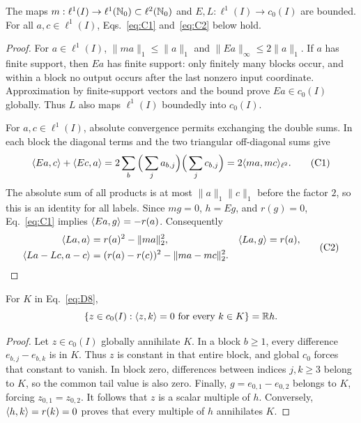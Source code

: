 \begin{lemma}
\label{lem:coordinate-pairing}
The maps $m:\ell^1(I)\to\ell^1(\mathbb N_0)\subset\ell^2(\mathbb N_0)$ and
$E,L:\ell^1(I)\to c_0(I)$ are bounded. For all $a,c\in\ell^1(I)$,
Eqs.~\eqref{eq:C1} and~\eqref{eq:C2} below hold.
\end{lemma}
\begin{proof}
\label{sec:C1}
For $a\in\ell^1(I)$, $\|ma\|_1\le\|a\|_1$ and
$\|Ea\|_\infty\le2\|a\|_1$. If $a$ has finite support, then $Ea$ has
finite support: only finitely many blocks occur, and within a block no
output occurs after the last nonzero input coordinate. Approximation by
finite-support vectors and the bound prove $Ea\in c_0(I)$ globally.
Thus $L$ also maps $\ell^1(I)$ boundedly into $c_0(I)$.

For $a,c\in\ell^1(I)$, absolute convergence permits exchanging the double
sums. In each block the diagonal terms and the two triangular
off-diagonal sums give
\begin{equation}
\langle Ea,c\rangle+\langle Ec,a\rangle
 =2\sum_b\Big(\sum_j a_{b,j}\Big)\Big(\sum_j c_{b,j}\Big)
 =2\langle ma,mc\rangle_{\ell^2}.
\tag{C1}\label{eq:C1}
\end{equation}
The absolute sum of all products is at most $\|a\|_1\|c\|_1$ before the
factor $2$, so this is an identity for all labels. Since $mg=0$, $h=Eg$,
and $r(g)=0$, Eq.~\eqref{eq:C1} implies $\langle Ea,g\rangle=-r(a)$.
Consequently
\begin{equation}
\begin{aligned}
\langle La,a\rangle&=r(a)^2-\|ma\|_2^2,&
\langle La,g\rangle&=r(a),\\
\langle La-Lc,a-c\rangle&=(r(a)-r(c))^2-\|ma-mc\|_2^2.
\end{aligned}
\tag{C2}\label{eq:C2}
\end{equation}
\end{proof}

\begin{lemma}
\label{lem:coordinate-annihilator}
For $K$ in Eq.~\eqref{eq:D8},
\[
\{z\in c_0(I):\langle z,k\rangle=0\ \text{for every }k\in K\}=\mathbb R h.
\]
\end{lemma}
\begin{proof}
Let $z\in c_0(I)$ globally annihilate $K$. In a block $b\ge1$, every
difference $e_{b,j}-e_{b,k}$ is in $K$. Thus $z$ is constant in that
entire block, and global $c_0$ forces that constant to vanish. In block
zero, differences between indices $j,k\ge3$ belong to $K$, so the common
tail value is also zero. Finally, $g=e_{0,1}-e_{0,2}$ belongs to $K$,
forcing $z_{0,1}=z_{0,2}$. It follows that $z$ is a scalar multiple of
$h$. Conversely, $\langle h,k\rangle=r(k)=0$ proves that every multiple of $h$
annihilates $K$.
\end{proof}

